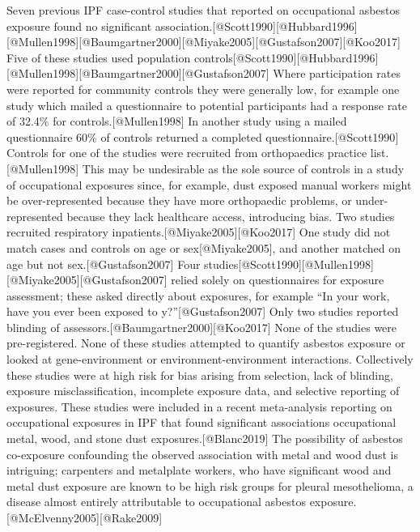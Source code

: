 Seven previous IPF case-control studies that reported on occupational
asbestos exposure found no significant
association.{[}@Scott1990{]}{[}@Hubbard1996{]}{[}@Mullen1998{]}{[}@Baumgartner2000{]}{[}@Miyake2005{]}{[}@Gustafson2007{]}{[}@Koo2017{]}
Five of these studies used population
controls{[}@Scott1990{]}{[}@Hubbard1996{]}{[}@Mullen1998{]}{[}@Baumgartner2000{]}{[}@Gustafson2007{]}
Where participation rates were reported for community controls they were
generally low, for example one study which mailed a questionnaire to
potential participants had a response rate of 32.4\% for
controls.{[}@Mullen1998{]} In another study using a mailed questionnaire
60\% of controls returned a completed questionnaire.{[}@Scott1990{]}
Controls for one of the studies were recruited from orthopaedics
practice list.{[}@Mullen1998{]} This may be undesirable as the sole
source of controls in a study of occupational exposures since, for
example, dust exposed manual workers might be over-represented because
they have more orthopaedic problems, or under-represented because they
lack healthcare access, introducing bias. Two studies recruited
respiratory inpatients.{[}@Miyake2005{]}{[}@Koo2017{]} One study did not
match cases and controls on age or sex{[}@Miyake2005{]}, and another
matched on age but not sex.{[}@Gustafson2007{]} Four
studies{[}@Scott1990{]}{[}@Mullen1998{]}{[}@Miyake2005{]}{[}@Gustafson2007{]}
relied solely on questionnaires for exposure assessment; these asked
directly about exposures, for example ``In your work, have you ever been
exposed to y?''{[}@Gustafson2007{]} Only two studies reported blinding
of assessors.{[}@Baumgartner2000{]}{[}@Koo2017{]} None of the studies
were pre-registered. None of these studies attempted to quantify
asbestos exposure or looked at gene-environment or
environment-environment interactions. Collectively these studies were at
high risk for bias arising from selection, lack of blinding, exposure
misclassification, incomplete exposure data, and selective reporting of
exposures. These studies were included in a recent meta-analysis
reporting on occupational exposures in IPF that found significant
associations occupational metal, wood, and stone dust
exposures.{[}@Blanc2019{]} The possibility of asbestos co-exposure
confounding the observed association with metal and wood dust is
intriguing; carpenters and metalplate workers, who have significant wood
and metal dust exposure are known to be high risk groups for pleural
mesothelioma, a disease almost entirely attributable to occupational
asbestos exposure.{[}@McElvenny2005{]}{[}@Rake2009{]}

